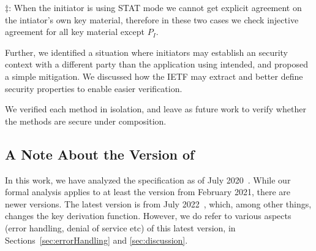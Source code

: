 \documentclass[runningheads]{llncs}
\begin{document}
\begin{table*}[t]
{            $\ddagger$: When the initiator is using STAT mode we
            cannot get explicit agreement on the intiator's own key
            material, therefore in these two cases we check injective
            agreement for all key material except $P_I$.\\
          }
                    \label{tab:props}
\end{table*}

Further, we identified a situation where initiators may establish an 
\mOscore{}
security context with a different party than the application using \mEdhoc{}
intended, and proposed a simple mitigation.
%
We discussed how the IETF may extract and better define security properties 
to
enable easier verification.

We verified each method in isolation, and leave as future work to verify 
whether
the methods are secure under composition.

\subsection{A Note About the Version of \mEdhoc}
\label{sec:newdrafts}
In this work, we have analyzed the \mEdhoc{} specification as of July
2020~\cite{our-analysis-selander-lake-edhoc-00}.
%
While our formal analysis applies to at least the version from February 2021, there are newer versions.
%
The latest version is from July 2022~\cite{draft-ietf-lake-edhoc-15}, which, among other things, changes the key derivation function.
%
However, we do refer to various aspects (error handling, denial of service etc) of this latest version, in Sections~\ref{sec:errorHandling} and \ref{sec:discussion}.
\end{document}
